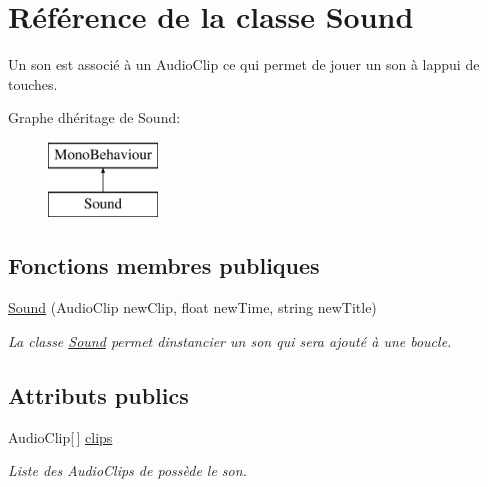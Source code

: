 \hypertarget{class_sound}{}\section{Référence de la classe Sound}
\label{class_sound}


Un son est associé à un Audio\+Clip ce qui permet de jouer un son à l\textquotesingle{}appui de touches.  


Graphe d\textquotesingle{}héritage de Sound\+:\begin{figure}[H]
\begin{center}
\leavevmode
\includegraphics[height=2.000000cm]{class_sound}
\end{center}
\end{figure}
\subsection*{Fonctions membres publiques}
\begin{DoxyCompactItemize}
\item 
\hyperlink{class_sound_a77ae1cc5550c178a2a72335ee12cbdd7}{Sound} (Audio\+Clip new\+Clip, float new\+Time, string new\+Title)
\begin{DoxyCompactList}\small\item\em La classe \hyperlink{class_sound}{Sound} permet d\textquotesingle{}instancier un son qui sera ajouté à une boucle. \end{DoxyCompactList}\end{DoxyCompactItemize}
\subsection*{Attributs publics}
\begin{DoxyCompactItemize}
\item 
Audio\+Clip\mbox{[}$\,$\mbox{]} \hyperlink{class_sound_a47365930606d69c51ad013120d4df151}{clips}
\begin{DoxyCompactList}\small\item\em Liste des Audio\+Clips de possède le son. \end{DoxyCompactList}\end{DoxyCompactItemize}
